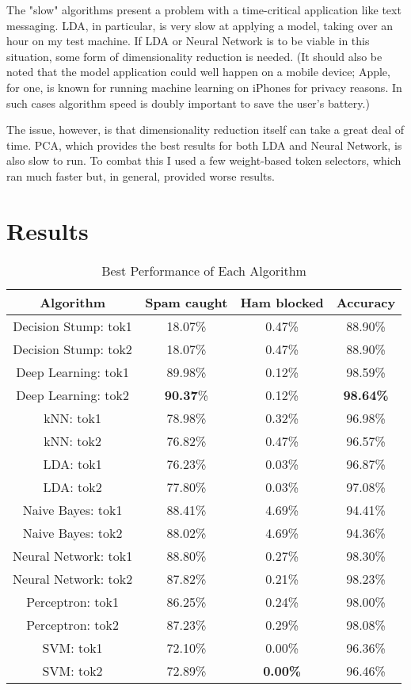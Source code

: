 \documentclass[10pt,journal,compsoc]{IEEEtran}
\begin{document}
The "slow" algorithms present a problem with a time-critical application like text messaging. LDA, in particular, is very slow at applying a model, taking over an hour on my test machine. If LDA or Neural Network is to be viable in this situation, some form of dimensionality reduction is needed. (It should also be noted that the model application could well happen on a mobile device; Apple, for one, is known for running machine learning on iPhones for privacy reasons. In such cases algorithm speed is doubly important to save the user's battery.)

The issue, however, is that dimensionality reduction itself can take a great deal of time. PCA, which provides the best results for both LDA and Neural Network, is also slow to run. To combat this I used a few weight-based token selectors, which ran much faster but, in general, provided worse results.

\section{Results}

\begin{table}[!t]
\renewcommand{\arraystretch}{1.3}
\caption{Best Performance of Each Algorithm}
\label{Table 2}
\centering
\begin{tabular}{|c|c|c|c|}
\hline
Algorithm & Spam caught & Ham blocked & Accuracy \\ \hline
Decision Stump: tok1 & 18.07\% & 0.47\% & 88.90\% \\ \hline
Decision Stump: tok2 & 18.07\% & 0.47\% & 88.90\% \\ \hline
Deep Learning: tok1 & 89.98\% & 0.12\% & 98.59\% \\ \hline
Deep Learning: tok2 & \textbf{90.37}\% & 0.12\% & \textbf{98.64\%} \\ \hline
kNN: tok1 & 78.98\% & 0.32\% & 96.98\% \\ \hline
kNN: tok2 & 76.82\% & 0.47\% & 96.57\% \\ \hline
LDA: tok1 & 76.23\% & 0.03\% & 96.87\% \\ \hline
LDA: tok2 & 77.80\% & 0.03\% & 97.08\% \\ \hline
Naive Bayes: tok1 & 88.41\% & 4.69\% & 94.41\% \\ \hline
Naive Bayes: tok2 & 88.02\% & 4.69\% & 94.36\% \\ \hline
Neural Network: tok1 & 88.80\% & 0.27\% & 98.30\% \\ \hline
Neural Network: tok2 & 87.82\% & 0.21\% & 98.23\% \\ \hline
Perceptron: tok1 & 86.25\% & 0.24\% & 98.00\% \\ \hline
Perceptron: tok2 & 87.23\% & 0.29\% & 98.08\% \\ \hline
SVM: tok1 & 72.10\% & 0.00\% & 96.36\% \\ \hline
SVM: tok2 & 72.89\% & \textbf{0.00\%} & 96.46\% \\ \hline

\end{tabular}
\end{table}
\end{document}
